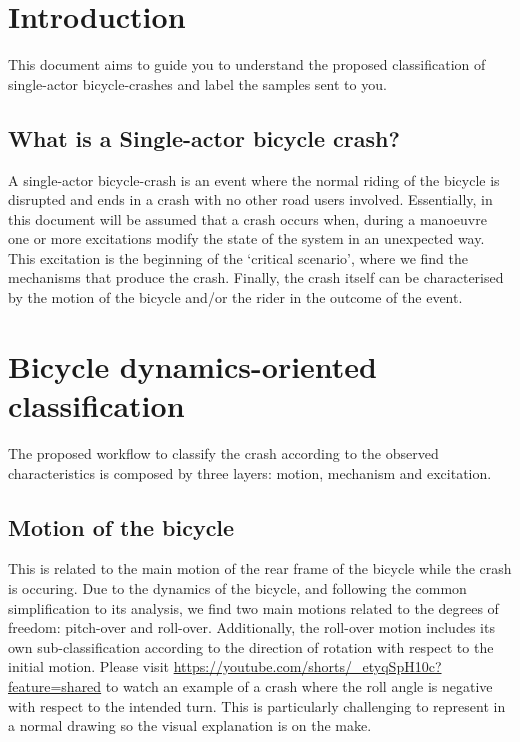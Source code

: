 \documentclass{article}
\begin{document}
\section{Introduction}

This document aims to guide you to understand the proposed classification \cite{Jac04} of single-actor bicycle-crashes and label the samples sent to you.

\subsection{What is a Single-actor bicycle crash?}

A single-actor bicycle-crash is an event where the normal riding of the bicycle is disrupted and ends in a crash with no other road users involved.
%
Essentially, in this document will be assumed that a crash occurs when, during a manoeuvre one or more excitations modify the state of the system in an unexpected way.
%
This excitation is the beginning of the `critical scenario', where we find the mechanisms that produce the crash.
%
Finally, the crash itself can be characterised by the motion of the bicycle and/or the rider in the outcome of the event.

\section{Bicycle dynamics-oriented classification}

The proposed workflow to classify the crash according to the observed characteristics is composed by three layers: motion, mechanism and excitation.%

\subsection{Motion of the bicycle}

This is related to the main motion of the rear frame of the bicycle while the crash is occuring.
%
Due to the dynamics of the bicycle, and following the common simplification to its analysis, we find two main motions related to the degrees of freedom: pitch-over and roll-over.
%
Additionally, the roll-over motion includes its own sub-classification according to the direction of rotation with respect to the initial motion.
% 
Please visit \url{https://youtube.com/shorts/_etyqSpH10c?feature=shared} to watch an example of a crash where the roll angle is negative with respect to the intended turn.
%
This is particularly challenging to represent in a normal drawing so the visual explanation is on the make.
\end{document}

